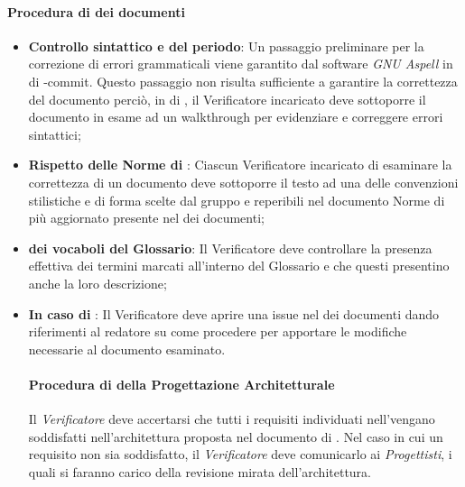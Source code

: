 \paragraph*{Procedura di  dei documenti}
\begin{itemize}
\item \textbf{Controllo sintattico e del periodo}: Un passaggio preliminare per la correzione di errori grammaticali viene garantito dal software \textit{GNU Aspell} in  di -commit. Questo passaggio non risulta sufficiente a garantire la correttezza del documento perciò, in  di , il Verificatore incaricato deve sottoporre il documento in esame ad un walkthrough per evidenziare e correggere errori sintattici;
  \item \textbf{Rispetto delle Norme di }: Ciascun Verificatore incaricato di esaminare la correttezza di un documento deve sottoporre il testo ad una  delle convenzioni stilistiche e di forma scelte dal gruppo e reperibili nel documento Norme di  pi\`u aggiornato presente nel  dei documenti;
  \item \textbf{ dei vocaboli del Glossario}: Il Verificatore deve controllare la presenza effettiva dei termini marcati all'interno del Glossario e che questi presentino anche la loro descrizione;
  \item \textbf{In caso di }: Il Verificatore deve aprire una issue nel  dei documenti dando riferimenti al redatore su come procedere per apportare le modifiche necessarie al documento esaminato.

\paragraph*{Procedura di  della Progettazione Architetturale}
Il \textit{Verificatore} deve accertarsi che tutti i requisiti individuati nell'\AnalisiDeiRequisiti vengano soddisfatti
nell'architettura proposta nel documento di \SpecificaTecnica.
Nel caso in cui un requisito non sia soddisfatto, il \textit{Verificatore} deve comunicarlo ai \textit{Progettisti}, i quali
si faranno carico della revisione mirata dell'architettura. 



\end{itemize}
